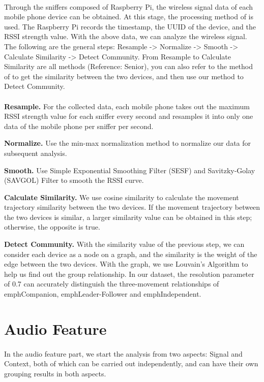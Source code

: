 \documentclass[a4paper,12pt]{report}
\begin{document}
\paragraph{}
Through the sniffers composed of Raspberry Pi, the wireless signal data of each mobile phone device can be obtained. At this stage, the processing method of \cite{chen2019witrack} is used. The Raspberry Pi records the timestamp, the UUID of the device, and the RSSI strength value. With the above data, we can analyze the wireless signal. The following are the general steps: Resample -> Normalize -> Smooth -> Calculate Similarity -> Detect Community. From Resample to Calculate Similarity are all methods (Reference: Senior), you can also refer to the method of \cite{lai2021viwise} \cite{tsai2020proximity} to get the similarity between the two devices, and then use our method to Detect Community.
\\
\\
\textbf{Resample.} For the collected data, each mobile phone takes out the maximum RSSI strength value for each sniffer every second and resamples it into only one data of the mobile phone per sniffer per second.

\textbf{Normalize.} Use the min-max normalization method to normalize our data for subsequent analysis.

\textbf{Smooth.} Use Simple Exponential Smoothing Filter (SESF) and Savitzky-Golay (SAVGOL) Filter to smooth the RSSI curve.

\textbf{Calculate Similarity.} We use cosine similarity to calculate the movement trajectory similarity between the two devices. If the movement trajectory between the two devices is similar, a larger similarity value can be obtained in this step; otherwise, the opposite is true.

\textbf{Detect Community.} With the similarity value of the previous step, we can consider each device as a node on a graph, and the similarity is the weight of the edge between the two devices. With the graph, we use Louvain's Algorithm to help us find out the group relationship. In our dataset, the resolution parameter of 0.7 can accurately distinguish the three-movement relationships of emph{Companion}, emph{Leader-Follower} and emph{Independent}.
\section{Audio Feature}
\paragraph{}
In the audio feature part, we start the analysis from two aspects: Signal and Context, both of which can be carried out independently, and can have their own grouping results in both aspects.
\end{document}
